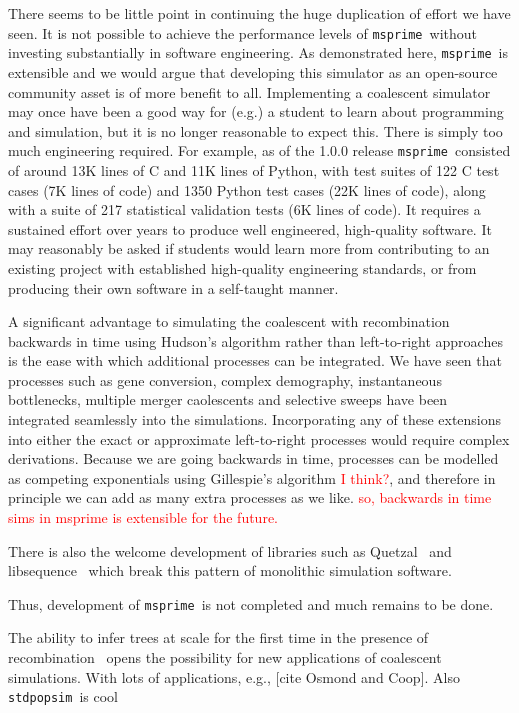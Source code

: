 \documentclass{article}
\newcommand{\msprime}[0]{\texttt{msprime}}
\newcommand{\stdpopsim}[0]{\texttt{stdpopsim}}
\newcommand{\jkcomment}[1]{\textcolor{red}{#1}}
\begin{document}
There seems to be little point in continuing the huge duplication of effort we
have seen. It is not possible to achieve the performance levels of \msprime\
without investing substantially in software engineering. As demonstrated here,
\msprime\ is extensible and we would argue that developing this simulator as an
open-source community asset is of more benefit to all. Implementing a
coalescent simulator may once have been a good way for (e.g.) a student to
learn about programming and simulation, but it is no longer reasonable to
expect this. There is simply too much engineering required. For example, as of
the 1.0.0 release \msprime\ consisted of around 13K lines of C and 11K
lines of Python, with test suites of 122 C test cases (7K lines of code) and
1350 Python test cases (22K lines of code), along with a suite of 217
statistical validation tests (6K lines of code). It requires a sustained effort
over years to produce well engineered, high-quality software. It may reasonably
be asked if students would learn more from contributing to an existing project
with established high-quality engineering standards, or from producing their own
software in a self-taught manner.

A significant advantage to simulating the coalescent with recombination
backwards in time using Hudson's algorithm rather than
left-to-right
approaches~\citep{wiuf1999recombination,chen2009fast,staab2015scrm}
is the ease with which additional processes can be integrated.
We have seen that processes such as gene conversion, complex
demography, instantaneous bottlenecks, multiple merger caolescents
and selective sweeps have been integrated seamlessly into
the simulations. Incorporating any of these extensions into
either the exact or approximate left-to-right processes would require
complex derivations. Because we are going backwards
in time, processes can be modelled as competing exponentials
using Gillespie's algorithm \jkcomment{I think?},
and therefore in principle we can
add as many extra processes as we like.
\jkcomment{so, backwards in time
sims in msprime is extensible for the future.}


There is also the welcome development of libraries such as
Quetzal~\citep{becheler2019quetzal} and libsequence~\citep{thornton2014cpp}
which break this pattern of monolithic simulation software.


Thus, development of \msprime\ is not completed and much remains
to be done.


The ability to infer trees at scale for the first time
in the presence of
recombination~\citep{harris2019database,kelleher2019inferring,
speidel2019method,tang2019genealogy}
opens the possibility for new applications of coalescent simulations.
With lots of applications, e.g., [cite Osmond and Coop].
Also \stdpopsim\ is cool~\citep{adrion2020community}
\end{document}

